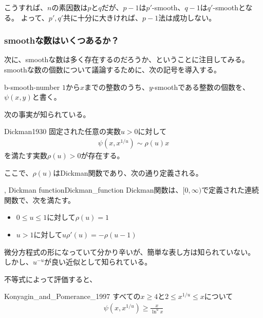こうすれば、$n$の素因数は$p$と$q$だが、$p-1$は$p'$-smooth、$q-1$は$q'$-smoothとなる。
よって、$p',q'$共に十分に大きければ、$p-1$法は成功しない。

\subsubsection{smoothな数はいくつあるか？}
次に、smoothな数は多く存在するのだろうか、ということに注目してみる。
smoothな数の個数について議論するために、次の記号を導入する。

\begin{Defi}{}{b-smooth-number}
$1$から$x$までの整数のうち、$y$-smoothである整数の個数を、$\psi(x,y)$と書く。
\end{Defi}

次の事実が知られている。

\begin{Theo}{\cite{Dickman1930}}{Dickman1930}
固定された任意の実数$u>0$に対して
\begin{align*}
\psi(x, x^{1/u}) \sim \rho(u) x
\end{align*}
を満たす実数$\rho(u)>0$が存在する。
\end{Theo}

ここで、$\rho(u)$はDickman関数であり、次の通り定義される。

\begin{Defi}{, Dickman function}{Dickman_function}
Dickman関数は、$[0,\infty)$で定義された連続関数で、次を満たす。
\begin{itemize}
\item $0\le u \le 1$に対して$\rho(u) = 1$
\item $u > 1$に対して$u\rho'(u) = -\rho(u-1)$
\end{itemize}
\end{Defi}

微分方程式の形になっていて分かり辛いが、簡単な表し方は知られていない。
しかし、$u^{-u}$が良い近似として知られている。

不等式によって評価すると、
\begin{Theo}{\cite{Konyagin2013}}{Konyagin_and_Pomerance_1997}
すべての$x\ge4$と$2 \le x^{1/u}\le x$について
\begin{align*}
\psi(x, x^{1/u}) \ge \frac{x}{\ln^u x}
\end{align*}
\end{Theo}

